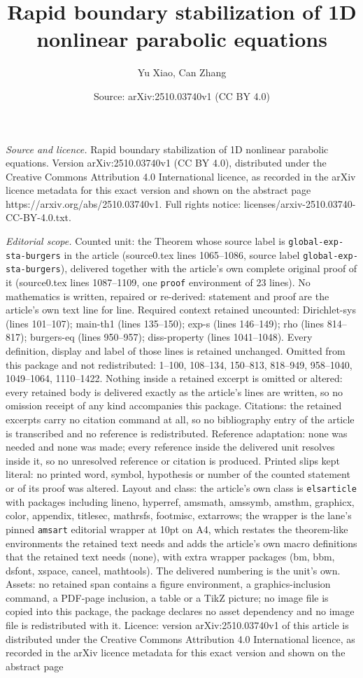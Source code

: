\documentclass[10pt,a4paper]{amsart}
\title[Rapid boundary stabilization of 1D nonlinear parabolic equat]{Rapid boundary stabilization of 1D nonlinear parabolic equations}
\author{Yu Xiao, Can Zhang}
\date{Source: arXiv:2510.03740v1 (CC BY 4.0)}
\begin{document}
\maketitle

\noindent\emph{Source and licence.} Rapid boundary stabilization of 1D nonlinear parabolic equations. Version arXiv:2510.03740v1 (CC BY 4.0), distributed under the Creative Commons Attribution 4.0 International licence, as recorded in the arXiv licence metadata for this exact version and shown on the abstract page https://arxiv.org/abs/2510.03740v1. Full rights notice: licenses/arxiv-2510.03740-CC-BY-4.0.txt.\par\smallskip

\noindent\textit{Editorial scope.} Counted unit: the Theorem whose source label is \texttt{global-exp-sta-burgers} in the article (source0.tex lines 1065--1086, source label \texttt{global-exp-sta-burgers}), delivered together with the article's own complete original proof of it (source0.tex lines 1087--1109, one \texttt{proof} environment of 23 lines). No mathematics is written, repaired or re-derived: statement and proof are the article's own text line for line. Required context retained uncounted: Dirichlet-sys (lines 101--107); main-th1 (lines 135--150); exp-s (lines 146--149); rho (lines 814--817); burgers-eq (lines 950--957); diss-property (lines 1041--1048). Every definition, display and label of those lines is retained unchanged. Omitted from this package and not redistributed: 1--100, 108--134, 150--813, 818--949, 958--1040, 1049--1064, 1110--1422. Nothing inside a retained excerpt is omitted or altered: every retained body is delivered exactly as the article's lines are written, so no omission receipt of any kind accompanies this package. Citations: the retained excerpts carry no citation command at all, so no bibliography entry of the article is transcribed and no reference is redistributed. Reference adaptation: none was needed and none was made; every reference inside the delivered unit resolves inside it, so no unresolved reference or citation is produced. Printed slips kept literal: no printed word, symbol, hypothesis or number of the counted statement or of its proof was altered. Layout and class: the article's own class is \texttt{elsarticle} with packages including lineno, hyperref, amsmath, amssymb, amsthm, graphicx, color, appendix, titlesec, mathrsfs, footmisc, extarrows; the wrapper is the lane's pinned \texttt{amsart} editorial wrapper at 10pt on A4, which restates the theorem-like environments the retained text needs and adds the article's own macro definitions that the retained text needs (none), with extra wrapper packages (bm, bbm, dsfont, xspace, cancel, mathtools). The delivered numbering is the unit's own. Assets: no retained span contains a figure environment, a graphics-inclusion command, a PDF-page inclusion, a table or a TikZ picture; no image file is copied into this package, the package declares no asset dependency and no image file is redistributed with it. Licence: version arXiv:2510.03740v1 of this article is distributed under the Creative Commons Attribution 4.0 International licence, as recorded in the arXiv licence metadata for this exact version and shown on the abstract page 
\end{document}
